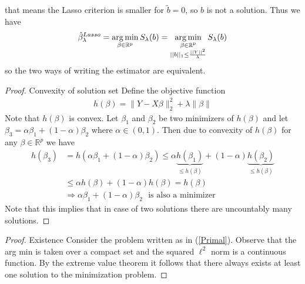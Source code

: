 \documentclass{article}
\theoremstyle{definition}
\DeclareMathOperator*{\argmin}{arg\,min}
\begin{document}
that means the Lasso criterion is smaller for $\tilde{b}=0$, so $b$ is not a solution.
Thus we have
\begin{equation*}
 \hat{\beta}_\lambda^{Lasso} = \argmin_{\beta \in\rm \mathbb{R}^p} S_\lambda(b) = \argmin_{\substack{\beta \in\rm \mathbb{R}^p\\ ||b||_1 \leq \frac{||Y||^2}{\lambda}}} S_\lambda(b)
\end{equation*}
so the two ways of writing the estimator are equivalent.

\begin{proof} Convexity of solution set \newline
{}
Define the objective function
\begin{align*}
h(\beta)=\|Y-X\beta\|_2^2+\lambda\|\beta\|
\end{align*}
Note that $h(\beta)$ is convex. Let $\beta_1$ and $\beta_2$ be two minimizers of $h(\beta)$ and let $\beta_3=\alpha\beta_1+(1-\alpha)\beta_2$ where $\alpha \in (0,1)$. Then due to convexity of $h(\beta)$ for any $\beta \in \mathbb{R}^p$ we have
\begin{align*}
h(\beta_3)&=h(\alpha\beta_1+(1-\alpha)\beta_2) \leq \alpha \underbrace{h(\beta_1)}_{\leq h(\beta)}+(1-\alpha)\underbrace{h(\beta_2)}_{\leq h(\beta)} \\ &\leq \alpha h(\beta)+(1-\alpha)h(\beta)=h(\beta) \\ &\Rightarrow \alpha\beta_1+(1-\alpha)\beta_2 \ \ \ \text{is also a minimizer}
\end{align*}
Note that this implies that in case of two solutions there are uncountably many solutions.
\end{proof}

\begin{proof} Existence \newline
Consider the problem written as in (\ref{Primal}). Observe that the arg min is taken over a compact set and the squared $\ell^2$ norm is a continuous function. By the extreme value theorem it follows that there always exists at least one solution to the minimization problem.
\end{proof}
\end{document}
